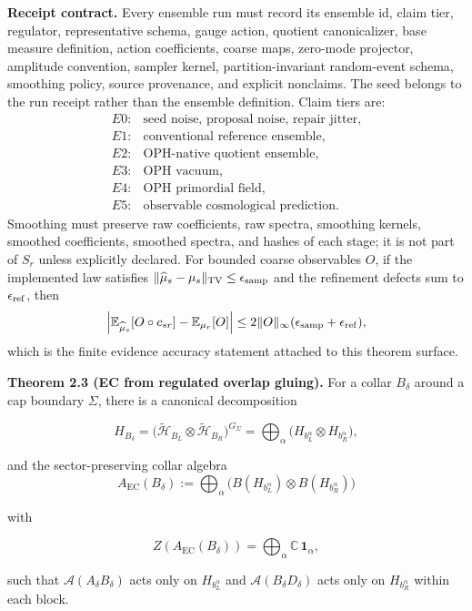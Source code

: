 

\textbf{Receipt contract.} Every ensemble run must record its ensemble id, claim tier,
regulator, representative schema, gauge action, quotient canonicalizer, base
measure definition, action coefficients, coarse maps, zero-mode projector, amplitude
convention, sampler kernel, partition-invariant random-event schema, smoothing policy, source
provenance, and explicit nonclaims. The seed belongs to the run receipt rather than the ensemble
definition. Claim tiers are:
\[
\begin{array}{ll}
E0:&\text{seed noise, proposal noise, repair jitter},\\
E1:&\text{conventional reference ensemble},\\
E2:&\text{OPH-native quotient ensemble},\\
E3:&\text{OPH vacuum},\\
E4:&\text{OPH primordial field},\\
E5:&\text{observable cosmological prediction}.
\end{array}
\]
Smoothing must preserve raw coefficients, raw spectra, smoothing kernels, smoothed coefficients,
smoothed spectra, and hashes of each stage; it is not part of \(S_r\) unless explicitly declared.
For bounded coarse observables \(O\), if the implemented law satisfies
\(\|\widehat\mu_s-\mu_s\|_{\mathrm{TV}}\le\epsilon_{\rm samp}\) and the refinement defects sum to
\(\epsilon_{\rm ref}\), then
\[
\left|\mathbb E_{\widehat\mu_s}[O\circ c_{sr}]-\mathbb E_{\mu_r}[O]\right|
\le
2\|O\|_\infty(\epsilon_{\rm samp}+\epsilon_{\rm ref}),
\]
which is the finite evidence accuracy statement attached to this theorem surface.

\textbf{Theorem 2.3 (EC from regulated overlap gluing).} For a collar \(B_\delta\) around a cap boundary \(\Sigma\), there is a canonical decomposition

\[
H_{B_\delta} = \bigl(\tilde{\mathcal H}_{B_L}\otimes \tilde{\mathcal H}_{B_R}\bigr)^{G_\Sigma}
= \bigoplus_{\alpha}
\bigl(H_{b_L^{\alpha}} \otimes H_{b_R^{\alpha}}\bigr),
\]

and the sector-preserving collar algebra
\[
A_{\mathrm{EC}}(B_\delta):=\bigoplus_\alpha
\bigl(B(H_{b_L^\alpha}) \otimes B(H_{b_R^\alpha})\bigr)
\]

with

\[
Z(A_{\mathrm{EC}}(B_\delta)) = \bigoplus_\alpha \mathbb C\,\mathbf 1_\alpha,
\]

such that \(\mathcal{A}(A_\delta B_\delta)\) acts only on \(H_{b_L^\alpha}\) and \(\mathcal{A}(B_\delta D_\delta)\) acts only on \(H_{b_R^\alpha}\) within each block.

